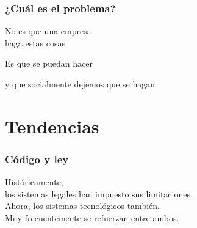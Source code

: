 \documentclass[17pt,aspectratio=169]{beamer}
\begin{document}

\begin{frame}
\frametitle{¿Cuál es el problema?}

{\large
\begin{center}
No es que una empresa \\
haga estas cosas
\pause
\vspace{1cm}

Es que se puedan hacer
\pause
\vspace{1cm}

y que socialmente dejemos que se hagan
\end{center}
}
\end{frame}



\section{Tendencias}


\begin{frame}
\frametitle{Código y ley}

\begin{center}
  Históricamente, \\
  los sistemas legales han impuesto sus limitaciones. \\
  \vspace{1cm}
Ahora, los sistemas tecnológicos también. \\
  \vspace{1cm}
Muy frecuentemente se refuerzan entre ambos. \\
\end{center}

\end{frame}
\end{document}
